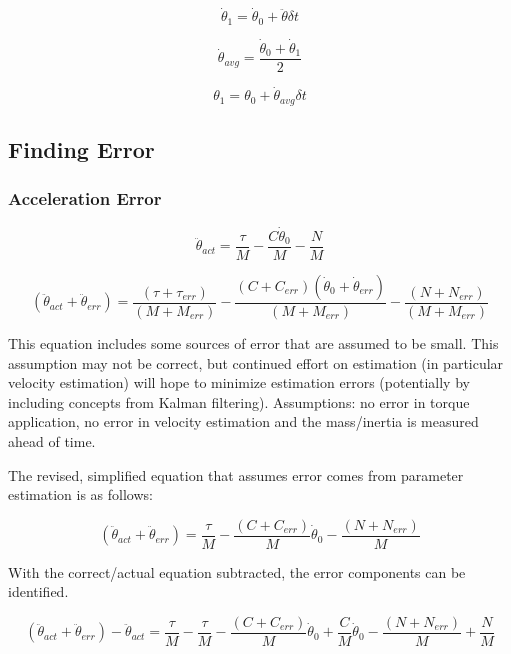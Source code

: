 \documentclass[12pt, letterpaper, oneside, notitlepage, onecolumn]{article}
\newcommand{\bbss}[1]{\subsection{#1}}
\newcommand{\bbsss}[1]{\subsubsection{#1}}
\begin{document}
\begin{equation}
\dot{\theta}_{1} = \dot{\theta}_{0} + \ddot{\theta} \delta t
\end{equation}

\begin{equation}
\dot{\theta}_{avg} = \dfrac{\dot{\theta}_{0} + \dot{\theta}_{1}}{2}
\end{equation}

\begin{equation}
\theta_{1} = \theta_{0} + \dot{\theta}_{avg} \delta t
\end{equation}

\bbss{Finding Error}

\bbsss{Acceleration Error}

\begin{equation}
\ddot{\theta}_{act} = \dfrac{\tau}{M} - \dfrac{C \dot{\theta}_{0}}{M} - \dfrac{N}{M}
\end{equation}

\begin{equation}
(\ddot{\theta}_{act} + \ddot{\theta}_{err}) = \dfrac{(\tau + \tau_{err})}{(M + M_{err})} - \dfrac{(C + C_{err}) (\dot{\theta}_{0} + \dot{\theta}_{err})}{(M + M_{err})} - \dfrac{(N + N_{err})}{(M + M_{err})}
\end{equation}

This equation includes some sources of error that are assumed to be small. This assumption may not be correct, but continued effort on estimation (in particular velocity estimation) will hope to minimize estimation errors (potentially by including concepts from Kalman filtering). Assumptions: no error in torque application, no error in velocity estimation and the mass/inertia is measured ahead of time.

The revised, simplified equation that assumes error comes from parameter estimation is as follows:

\begin{equation}
(\ddot{\theta}_{act} + \ddot{\theta}_{err}) = \dfrac{\tau}{M} - \dfrac{(C + C_{err})}{M}\dot{\theta}_{0} - \dfrac{(N + N_{err})}{M}
\end{equation}

With the correct/actual equation subtracted, the error components can be identified.

\begin{equation}
(\ddot{\theta}_{act} + \ddot{\theta}_{err}) - \ddot{\theta}_{act} =
\dfrac{\tau}{M} - \dfrac{\tau}{M}
- \dfrac{(C + C_{err})}{M}\dot{\theta}_{0} + \dfrac{C}{M}\dot{\theta}_{0}
- \dfrac{(N + N_{err})}{M}  + \dfrac{N}{M}
\end{equation}
\end{document}
